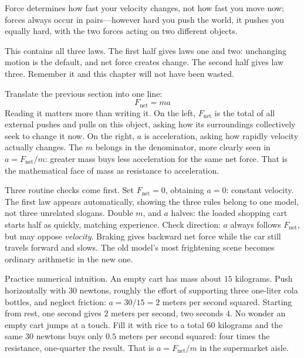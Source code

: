 
\begin{oneline}
Force determines how fast your velocity changes, not how fast you move now; forces always occur in pairs---however hard you push the world, it pushes you equally hard, with the two forces acting on two different objects.
\end{oneline}

This contains all three laws. The first half gives laws one and two: unchanging motion is the default, and net force creates change. The second half gives law three. Remember it and this chapter will not have been wasted.


\begin{mainline}
Translate the previous section into one line:
\[
  F_{\text{net}} = ma
\]
Reading it matters more than writing it. On the left, \(F_{\text{net}}\) is the total of all external pushes and pulls on this object, asking how its surroundings collectively seek to change it now. On the right, \(a\) is acceleration, asking how rapidly velocity actually changes. The \(m\) belongs in the denominator, more clearly seen in \(a=F_{\text{net}}/m\): greater mass buys less acceleration for the same net force. That is the mathematical face of mass as resistance to acceleration.

Three routine checks come first. Set \(F_{\text{net}}=0\), obtaining \(a=0\): constant velocity. The first law appears automatically, showing the three rules belong to one model, not three unrelated slogans. Double \(m\), and \(a\) halves: the loaded shopping cart starts half as quickly, matching experience. Check direction: \(a\) always follows \(F_{\text{net}}\), but may oppose \emph{velocity}. Braking gives backward net force while the car still travels forward and slows. The old model's most frightening scene becomes ordinary arithmetic in the new one.

Practice numerical intuition. An empty cart has mass about \(15\) kilograms. Push horizontally with \(30\) newtons, roughly the effort of supporting three one-liter cola bottles, and neglect friction: \(a=30/15=2\) meters per second squared. Starting from rest, one second gives \(2\) meters per second, two seconds \(4\). No wonder an empty cart jumps at a touch. Fill it with rice to a total \(60\) kilograms and the same \(30\) newtons buys only \(0.5\) meters per second squared: four times the resistance, one-quarter the result. That is \(a=F_{\text{net}}/m\) in the supermarket aisle.
\end{mainline}

